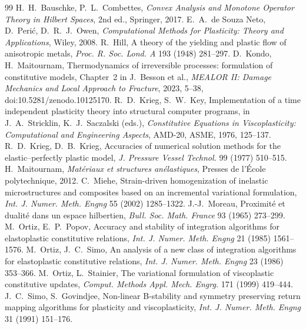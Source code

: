 \begin{chapterbib}{99}
 H.~H.~Bauschke, P.~L.~Combettes, \emph{Convex Analysis and Monotone Operator Theory in Hilbert Spaces}, 2nd ed., Springer, 2017.
 E.~A.~de Souza Neto, D.~Peri\'c, D.~R.~J.~Owen, \emph{Computational Methods for Plasticity: Theory and Applications}, Wiley, 2008.
 R.~Hill, A theory of the yielding and plastic flow of anisotropic metals, \emph{Proc. R. Soc. Lond. A} 193 (1948) 281--297.
 D.~Kondo, H.~Maitournam, Thermodynamics of irreversible processes: formulation of constitutive models, Chapter~2 in J.~Besson et al., \emph{MEALOR II: Damage Mechanics and Local Approach to Fracture}, 2023, 5--38, doi:10.5281/zenodo.10125170.
 R.~D.~Krieg, S.~W.~Key, Implementation of a time independent plasticity theory into structural computer programs, in J.~A.~Stricklin, K.~J.~Saczalski (eds.), \emph{Constitutive Equations in Viscoplasticity: Computational and Engineering Aspects}, AMD-20, ASME, 1976, 125--137.
 R.~D.~Krieg, D.~B.~Krieg, Accuracies of numerical solution methods for the elastic--perfectly plastic model, \emph{J. Pressure Vessel Technol.} 99 (1977) 510--515.
 H.~Maitournam, \emph{Mat\'eriaux et structures an\'elastiques}, Presses de l'\'Ecole polytechnique, 2012.
 C.~Miehe, Strain-driven homogenization of inelastic microstructures and composites based on an incremental variational formulation, \emph{Int. J. Numer. Meth. Engng} 55 (2002) 1285--1322.
 J.-J.~Moreau, Proximit\'e et dualit\'e dans un espace hilbertien, \emph{Bull. Soc. Math. France} 93 (1965) 273--299.
 M.~Ortiz, E.~P.~Popov, Accuracy and stability of integration algorithms for elastoplastic constitutive relations, \emph{Int. J. Numer. Meth. Engng} 21 (1985) 1561--1576.
 M.~Ortiz, J.~C.~Simo, An analysis of a new class of integration algorithms for elastoplastic constitutive relations, \emph{Int. J. Numer. Meth. Engng} 23 (1986) 353--366.
 M.~Ortiz, L.~Stainier, The variational formulation of viscoplastic constitutive updates, \emph{Comput. Methods Appl. Mech. Engrg.} 171 (1999) 419--444.
 J.~C.~Simo, S.~Govindjee, Non-linear B-stability and symmetry preserving return mapping algorithms for plasticity and viscoplasticity, \emph{Int. J. Numer. Meth. Engng} 31 (1991) 151--176.

\end{chapterbib}
